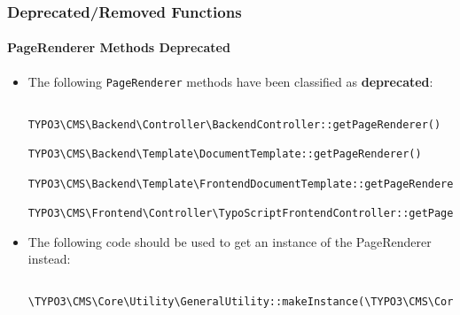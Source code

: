 
\begin{frame}[fragile]
	\frametitle{Deprecated/Removed Functions}
	\framesubtitle{PageRenderer Methods Deprecated}

	\lstset{basicstyle=\tiny\ttfamily}

	\begin{itemize}
		\item The following \texttt{PageRenderer} methods have been classified as \textbf{deprecated}:

			\begin{lstlisting}
				TYPO3\CMS\Backend\Controller\BackendController::getPageRenderer()
				TYPO3\CMS\Backend\Template\DocumentTemplate::getPageRenderer()
				TYPO3\CMS\Backend\Template\FrontendDocumentTemplate::getPageRenderer()
				TYPO3\CMS\Frontend\Controller\TypoScriptFrontendController::getPageRenderer()
			\end{lstlisting}

		\item The following code should be used to get an instance of the PageRenderer instead:

			\begin{lstlisting}
				\TYPO3\CMS\Core\Utility\GeneralUtility::makeInstance(\TYPO3\CMS\Core\Page\PageRenderer::class)
			\end{lstlisting}

	\end{itemize}

\end{frame}


